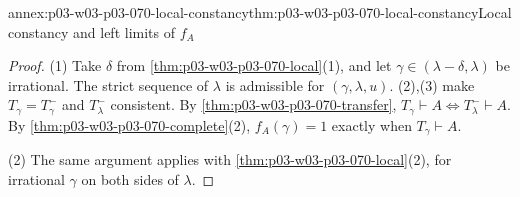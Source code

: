 \begin{annexitem}{annex:p03-w03-p03-070-local-constancy}{thm:p03-w03-p03-070-local-constancy}{Local constancy and left limits of \(f_A\)}
\begin{proof}
(1) Take \(\delta\) from \cref{thm:p03-w03-p03-070-local}(1), and let
\(\gamma\in(\lambda-\delta,\lambda)\) be irrational.  The strict sequence of
\(\lambda\) is admissible for \((\gamma,\lambda,u)\).
(2),(3) make \(T_\gamma=T^-_\gamma\) and
\(T^-_\lambda\) consistent.  By \cref{thm:p03-w03-p03-070-transfer},
\(T_\gamma\vdash A\iff T^-_\lambda\vdash A\).  By
\cref{thm:p03-w03-p03-070-complete}(2), \(f_A(\gamma)=1\) exactly when
\(T_\gamma\vdash A\).

(2) The same argument applies with \cref{thm:p03-w03-p03-070-local}(2), for
irrational \(\gamma\) on both sides of \(\lambda\).
\end{proof}
\end{annexitem}

